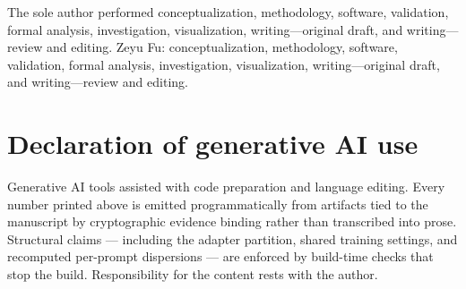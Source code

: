 \ifdefined\ANONYMOUS
The sole author performed conceptualization, methodology, software, validation,
formal analysis, investigation, visualization, writing---original draft, and
writing---review and editing.
\else
Zeyu Fu: conceptualization, methodology, software, validation, formal analysis,
investigation, visualization, writing---original draft, and writing---review
and editing.
\fi


\section*{Declaration of generative AI use}

Generative AI tools assisted with code preparation and language editing. Every
number printed above is emitted programmatically from artifacts tied to the
manuscript by cryptographic evidence binding rather than transcribed into
prose. Structural claims --- including the adapter partition, shared training
settings, and recomputed per-prompt dispersions --- are enforced by build-time
checks that stop the build. Responsibility for the content rests with the
author.
